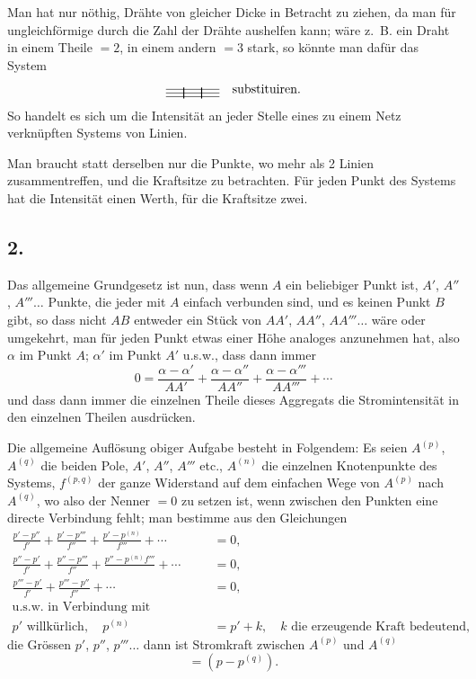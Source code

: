 \documentclass[fontsize=10pt,paper=a5,pagesize=auto]{scrbook}
\newcommand{\origpage}[1]{\marginpar{\footnotesize\textit{S. #1}}}
\begin{document}
Man hat nur nöthig, Drähte von gleicher Dicke in Betracht zu ziehen, da man für ungleichförmige durch die Zahl der Drähte aushelfen kann; wäre z.~B. ein Draht in einem Theile $=2$, in einem andern $=3$ stark, so könnte man dafür das System
\[
\begin{tikzpicture}[baseline=(current bounding box.center),scale=0.5]
\draw (0,0) -- (1,0);
\draw (0,-0.2) -- (1,-0.2);
\draw (0,-0.4) -- (1,-0.4);
\draw[thick] (1,0.1) -- (1,-0.5);
\draw (1,0) -- (2,0);
\draw (1,-0.2) -- (2,-0.2);
\draw (1,-0.4) -- (2,-0.4);
\draw[thick] (2,0.1) -- (2,-0.5);
\draw (2,0) -- (3,0);
\draw (2,-0.2) -- (3,-0.2);
\draw (2,-0.4) -- (3,-0.4);
\end{tikzpicture}
\quad\text{substituiren.}
\]
So handelt es sich um die Intensität an jeder Stelle eines zu einem Netz verknüpften Systems von Linien.

Man braucht statt derselben nur die Punkte, wo mehr als 2 Linien zusammentreffen, und die Kraftsitze zu betrachten. Für jeden Punkt des Systems hat die Intensität einen Werth, für die Kraftsitze zwei.

\subsection*{2.}
\origpage{602}
Das allgemeine Grundgesetz ist nun, dass wenn $A$ ein beliebiger Punkt ist, $A'$, $A''$, $A'''\dots$ Punkte, die jeder mit $A$ einfach verbunden sind, und es keinen Punkt $B$ gibt, so dass nicht $AB$ entweder ein Stück von $AA'$, $AA''$, $AA'''\dots$ wäre oder umgekehrt, man für jeden Punkt etwas einer Höhe analoges anzunehmen hat, also $\alpha$ im Punkt $A$; $\alpha'$ im Punkt $A'$ u.s.w., dass dann immer
\[
0 = \frac{\alpha - \alpha'}{AA'} + \frac{\alpha - \alpha''}{AA''} + \frac{\alpha - \alpha'''}{AA'''} + \cdots
\]
und dass dann immer die einzelnen Theile dieses Aggregats die Stromintensität in den einzelnen Theilen ausdrücken.

Die allgemeine Auflösung obiger Aufgabe besteht in Folgendem: Es seien $A^{(p)}$, $A^{(q)}$ die beiden Pole, $A'$, $A''$, $A'''$ etc., $A^{(n)}$ die einzelnen Knotenpunkte des Systems, $f^{(p,q)}$ der ganze Widerstand auf dem einfachen Wege von $A^{(p)}$ nach $A^{(q)}$, wo also der Nenner $=0$ zu setzen ist, wenn zwischen den Punkten eine directe Verbindung fehlt; man bestimme aus den Gleichungen
\begin{align*}
\frac{p' - p''}{f'} + \frac{p' - p'''}{f''} + \frac{p' - p^{(n)}}{f'''} + \cdots &= 0,\\
\frac{p'' - p'}{f'} + \frac{p'' - p'''}{f''} + \frac{p'' - p^{(n)}f'''}{\quad} + \cdots &= 0,\\
\frac{p''' - p'}{f'} + \frac{p''' - p''}{f''} + \cdots \qquad\qquad &= 0,\\
\text{u.s.w. in Verbindung mit folgenden}&\\
p' \text{ willkürlich}, \quad p^{(n)} &= p' + k, \quad k \text{ die erzeugende Kraft bedeutend,}
\end{align*}
die Grössen $p'$, $p''$, $p'''\dots$ dann ist Stromkraft zwischen $A^{(p)}$ und $A^{(q)}$
\[
= (p - p^{(q)}).
\]
\end{document}
